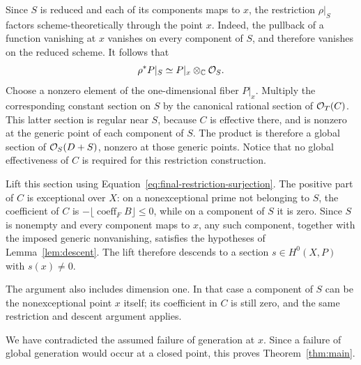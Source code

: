 Since \(S\) is reduced and each of its components maps to \(x\),
the restriction \(\rho|_S\) factors scheme-theoretically through the
point \(x\).  Indeed, the pullback of a function vanishing at \(x\)
vanishes on every component of \(S\), and therefore vanishes on the
reduced scheme.  It follows that
\[
 \rho^*P|_S\simeq P|_x\otimes_{\mathbb C}\mathcal O_S.
\]
Choose a nonzero element of the one-dimensional fiber \(P|_x\).
Multiply the corresponding constant section on \(S\) by the
canonical rational section of \(\mathcal O_T(C)\).  This latter section is
regular near \(S\), because \(C\) is effective there, and is nonzero
at the generic point of each component of \(S\).  The product is
therefore a global section of \(\mathcal O_S(D+S)\), nonzero at those generic
points.  Notice that no global effectiveness of \(C\) is required
for this restriction construction.

Lift this section using Equation~\eqref{eq:final-restriction-surjection}.
The positive part of \(C\) is exceptional over \(X\): on a
nonexceptional prime not belonging to \(S\), the
coefficient of \(C\) is \(-\lfloor\operatorname{coeff}_F B\rfloor
\leq0\), while on a component of \(S\) it is zero. Since \(S\) is
nonempty and every component maps to \(x\), any such component,
together with the imposed generic nonvanishing, satisfies the
hypotheses of Lemma~\ref{lem:descent}. The lift therefore descends to
a section \(s\in H^0(X,P)\) with \(s(x)\ne0\).

The argument also includes dimension one.  In that case a component
of \(S\) can be the nonexceptional point \(x\) itself; its
coefficient in \(C\) is still zero, and the same restriction and
descent argument applies.

We have contradicted the assumed failure of generation at \(x\).
Since a failure of global generation would occur at a closed point,
this proves Theorem~\ref{thm:main}.
